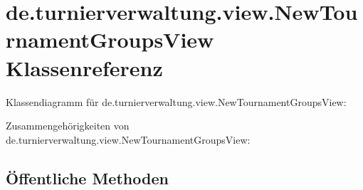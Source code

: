 \hypertarget{classde_1_1turnierverwaltung_1_1view_1_1_new_tournament_groups_view}{}\section{de.\+turnierverwaltung.\+view.\+New\+Tournament\+Groups\+View Klassenreferenz}
\label{classde_1_1turnierverwaltung_1_1view_1_1_new_tournament_groups_view}


Klassendiagramm für de.\+turnierverwaltung.\+view.\+New\+Tournament\+Groups\+View\+:


Zusammengehörigkeiten von de.\+turnierverwaltung.\+view.\+New\+Tournament\+Groups\+View\+:
\subsection*{Öffentliche Methoden}
